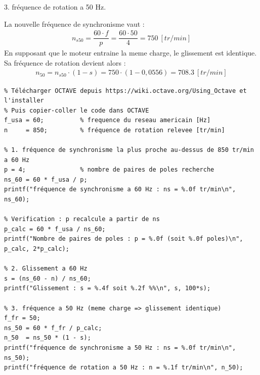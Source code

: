 \documentclass[a4paper,12pt,answers,addpoints]{exam}
\begin{document}
\begin{questions}
\begin{solution}
3. fréquence de rotation a 50 Hz.

La nouvelle fréquence de synchronisme vaut :
\begin{align*}
n_{s50} = \dfrac{60 \cdot f}{p} = \dfrac{60 \cdot 50}{4} = \qty{750}{[tr/min]}
\end{align*}
En supposant que le moteur entraine la meme charge, le glissement est identique. Sa fréquence de rotation devient alors :
\begin{align*}
n_{50} = n_{s50} \cdot (1 - s) = 750 \cdot (1 - 0,0556) = \qty{708,3}{[tr/min]}
\end{align*}


\newpage
\begin{verbatim}
% Télécharger OCTAVE depuis https://wiki.octave.org/Using_Octave et l'installer
% Puis copier-coller le code dans OCTAVE
f_usa = 60;          % frequence du reseau americain [Hz]
n     = 850;         % fréquence de rotation relevee [tr/min]

% 1. fréquence de synchronisme la plus proche au-dessus de 850 tr/min a 60 Hz
p = 4;               % nombre de paires de poles recherche
ns_60 = 60 * f_usa / p;
printf("fréquence de synchronisme a 60 Hz : ns = %.0f tr/min\n", ns_60);

% Verification : p recalcule a partir de ns
p_calc = 60 * f_usa / ns_60;
printf("Nombre de paires de poles : p = %.0f (soit %.0f poles)\n", p_calc, 2*p_calc);

% 2. Glissement a 60 Hz
s = (ns_60 - n) / ns_60;
printf("Glissement : s = %.4f soit %.2f %%\n", s, 100*s);

% 3. fréquence a 50 Hz (meme charge => glissement identique)
f_fr = 50;
ns_50 = 60 * f_fr / p_calc;
n_50  = ns_50 * (1 - s);
printf("fréquence de synchronisme a 50 Hz : ns = %.0f tr/min\n", ns_50);
printf("fréquence de rotation a 50 Hz : n = %.1f tr/min\n", n_50);
\end{verbatim}
\end{solution}
\end{questions}
\end{document}

